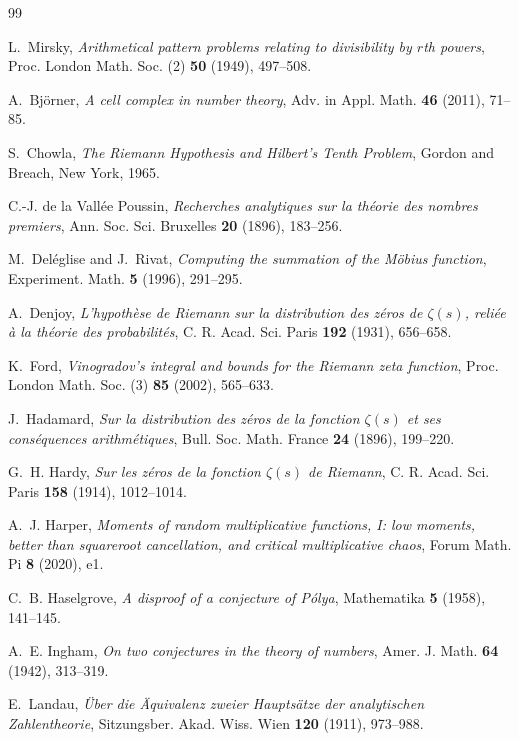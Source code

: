 \documentclass[11pt]{amsart}
\numberwithin{equation}{section}
\theoremstyle{plain}
\theoremstyle{definition}
\theoremstyle{remark}
\begin{document}
\begin{thebibliography}{99}

L.~Mirsky, \emph{Arithmetical pattern problems relating to divisibility by $r$th powers}, Proc. London Math. Soc. (2) \textbf{50} (1949), 497--508.

A.~Bj\"orner, \emph{A cell complex in number theory}, Adv. in Appl. Math.
\textbf{46} (2011), 71--85.

S.~Chowla, \emph{The Riemann Hypothesis and Hilbert's Tenth Problem}, Gordon
and Breach, New York, 1965.

C.-J. de la Vall\'ee Poussin, \emph{Recherches analytiques sur la th\'eorie
des nombres premiers}, Ann. Soc. Sci. Bruxelles \textbf{20} (1896), 183--256.

M.~Del\'eglise and J.~Rivat, \emph{Computing the summation of the M\"obius
function}, Experiment. Math. \textbf{5} (1996), 291--295.

A.~Denjoy, \emph{L'hypoth\`ese de Riemann sur la distribution des z\'eros de
$\zeta(s)$, reli\'ee \`a la th\'eorie des probabilit\'es}, C. R. Acad. Sci.
Paris \textbf{192} (1931), 656--658.

K.~Ford, \emph{Vinogradov's integral and bounds for the Riemann zeta
function}, Proc. London Math. Soc. (3) \textbf{85} (2002), 565--633.

J.~Hadamard, \emph{Sur la distribution des z\'eros de la fonction $\zeta(s)$
et ses cons\'equences arithm\'etiques}, Bull. Soc. Math. France \textbf{24}
(1896), 199--220.

G.~H. Hardy, \emph{Sur les z\'eros de la fonction $\zeta(s)$ de Riemann},
C. R. Acad. Sci. Paris \textbf{158} (1914), 1012--1014.

A.~J. Harper, \emph{Moments of random multiplicative functions, I: low
moments, better than squareroot cancellation, and critical multiplicative
chaos}, Forum Math. Pi \textbf{8} (2020), e1.

C.~B. Haselgrove, \emph{A disproof of a conjecture of P\'olya}, Mathematika
\textbf{5} (1958), 141--145.

A.~E. Ingham, \emph{On two conjectures in the theory of numbers}, Amer. J.
Math. \textbf{64} (1942), 313--319.

E.~Landau, \emph{\"Uber die \"Aquivalenz zweier Haupts\"atze der analytischen
Zahlentheorie}, Sitzungsber. Akad. Wiss. Wien \textbf{120} (1911), 973--988.


\end{thebibliography}
\end{document}
